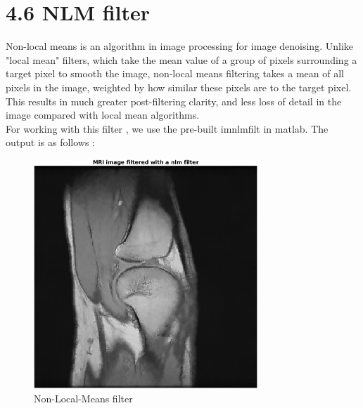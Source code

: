 \documentclass[12pt,fleqn]{article}
\begin{document}
\section{4.6 NLM filter}
Non-local means is an algorithm in image processing for image denoising. Unlike "local mean" filters, which take the mean value of a group of pixels surrounding a target pixel to smooth the image, non-local means filtering takes a mean of all pixels in the image, weighted by how similar these pixels are to the target pixel. This results in much greater post-filtering clarity, and less loss of detail in the image compared with local mean algorithms.\\
For working with this filter , we use the pre-built imnlmfilt in matlab. The output is as follows :
\begin{figure}[H]
	\centering
	\includegraphics[width=0.75\textwidth]{nlmfilter.png}
	\caption{Non-Local-Means filter}
	\label{fig:2.3.3}
\end{figure}
\end{document}

